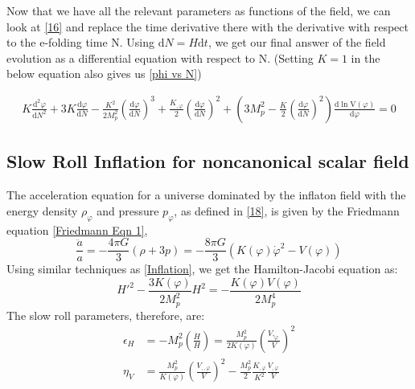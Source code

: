 \documentclass[aps,prd,reprint,preprintnumbers,showpacs,floatfix,nofootinbib,superscript address]{revtex4-2}
\begin{document}
Now that we have all the relevant parameters as functions of the field, we can look at \cref{16} and replace the time derivative there with the derivative with respect to the e-folding time N. Using $\text{d}N = H \text{d}t$, we get our final answer of the field evolution as a differential equation with respect to N. (Setting $K = 1$ in the below equation also gives us \cref{phi vs N})
\begin{widetext}
\begin{subequations}
\begin{align}\label{Kphi vs N}
    K\frac{\text{d}^2\varphi}{\text{d}N^2} +3 K \frac{\text{d}\varphi}{\text{d}N}  - \frac{K^2}{2M_p^2} \left(\frac{\text{d}\varphi}{\text{d}N} \right)^3  +  \frac{K_{,\varphi}}{2}  \left(\frac{\text{d}\varphi}{\text{d}N} \right)^2 +  \left( 3 M_p^2 - \frac{K}{2} \left(\frac{\text{d}\varphi}{\text{d}N} \right)^2 \right) \frac{\text{d}\ln \text{V}(\varphi)}{\text{d} \varphi} = 0    
\end{align}
\end{subequations}
\end{widetext}
\subsection{Slow Roll Inflation for noncanonical scalar field}
The acceleration equation for a universe dominated by the inflaton field with the energy density $\rho_{\varphi}$ and pressure $p_{\varphi}$, as defined in \cref{18}, is given by the Friedmann equation \cref{Friedmann Eqn 1},
\begin{equation}
    \frac{\ddot{a}}{a} = -\frac{4\pi G}{3} (\rho +3p) = -\frac{8\pi G}{3} (K(\varphi){\dot{\varphi}}^2 - V(\varphi)) 
\end{equation}
Using similar techniques as \cref{Inflation}, we get the Hamilton-Jacobi equation as: 
\begin{equation}    \label{KHJ}
    H'^2 - \frac{3K(\varphi)}{2M_p^2}H^2 = - \frac{K(\varphi) V(\varphi)}{2M_p^4} 
\end{equation}
The slow roll parameters, therefore, are:
\begin{align}
    \epsilon_H &= - M_p^2 \left(\frac{\dot{H}}{H} \right) = \frac{M_p^2}{2 K(\varphi)} \left(\frac{V,_\varphi}{V}\right)^2 \\
    \eta_V &= \frac{M_p^2}{K(\varphi)} \left( \frac{V_{,,\varphi}}{V} \right)^2 - \frac{M_p^2}{2} \frac{K_{,\varphi}}{K^2} \frac{V_{,\varphi}}{V}
\end{align}
\end{document}
